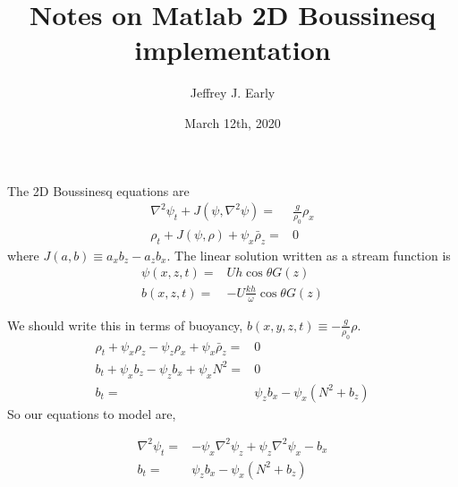 \documentclass[11pt]{article}
\title{Notes on Matlab 2D Boussinesq implementation}
\author{Jeffrey J. Early}
\date{March 12th, 2020}                                           %
\begin{document}
\maketitle
The 2D Boussinesq equations are
\begin{subequations}{}
\begin{align}
\label{streamfunction_equation}
\nabla^2 \psi_t +  J\left( \psi, \nabla^2 \psi \right) =& \frac{g}{\rho_0}\rho_x \\ \label{rho_equation}
\rho_t + J\left( \psi, \rho \right) + \psi_x \bar{\rho}_z =& 0
\end{align}
\end{subequations}
where $J(a,b) \equiv a_x b_z - a_z b_x$. The linear solution written as a stream function is
\begin{align}
\label{linear_streamfunction}
\psi(x,z,t) =& U h \cos \theta G(z) \\
b(x,z,t) =& -U \frac{kh}{\omega} \cos \theta G(z)
\end{align}

We should write this in terms of buoyancy, $b(x,y,z,t) \equiv -\frac{g}{\rho_0} \rho$.
\begin{subequations}{}
\begin{align}
\rho_t + \psi_x \rho_z - \psi_z \rho_x + \psi_x \bar{\rho}_z =& 0 \\
b_t + \psi_x b_z - \psi_z b_x + \psi_x N^2 =& 0 \\
b_t =& \psi_z b_x -\psi_x (N^2 + b_z) 
\end{align}
\end{subequations}
So our equations to model are,

\begin{subequations}{}
\begin{align}
\nabla^2 \psi_t =& -  \psi_x \nabla^2 \psi_z + \psi_z \nabla^2 \psi_x  -b_x \\ 
b_t =& \psi_z b_x -\psi_x (N^2 + b_z) 
\end{align}
\end{subequations}
\end{document}
